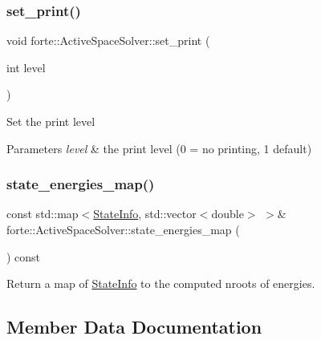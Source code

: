 \subsubsection{\texorpdfstring{set\+\_\+print()}{set\_print()}}
{\footnotesize\ttfamily void forte\+::\+Active\+Space\+Solver\+::set\+\_\+print (\begin{DoxyParamCaption}\item[{int}]{level }\end{DoxyParamCaption})}

Set the print level 
\begin{DoxyParams}{Parameters}
{\em level} & the print level (0 = no printing, 1 default) \\
\hline
\end{DoxyParams}
\mbox{\label{classforte_1_1_active_space_solver_a7b3fec1838a74fa058d232c7b7dc6b4c}} 
\subsubsection{\texorpdfstring{state\+\_\+energies\+\_\+map()}{state\_energies\_map()}}
{\footnotesize\ttfamily const std\+::map$<$\mbox{\hyperlink{classforte_1_1_state_info}{State\+Info}}, std\+::vector$<$double$>$ $>$\& forte\+::\+Active\+Space\+Solver\+::state\+\_\+energies\+\_\+map (\begin{DoxyParamCaption}{ }\end{DoxyParamCaption}) const\hspace{0.3cm}{\ttfamily [inline]}}



Return a map of \mbox{\hyperlink{classforte_1_1_state_info}{State\+Info}} to the computed nroots of energies. 



\subsection{Member Data Documentation}
\mbox{\label{classforte_1_1_active_space_solver_a0af4d2dcbe729958cc0526436534b61e}} 

